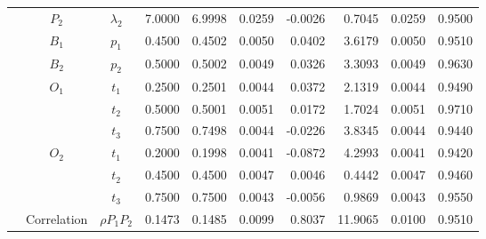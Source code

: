 \documentclass[letterpaper]{article}
\begin{document}
\begin{table}[h]
\begin{tabular}{cccrrrrrrr}
            & $P_2$       & $\lambda_2$    & 7.0000                 & 6.9998                 & 0.0259                 & -0.0026                & 0.7045                 & 0.0259                   & 0.9500                 \\
            & $B_1$       & $p_1$          & 0.4500                 & 0.4502                 & 0.0050                 & 0.0402                 & 3.6179                 & 0.0050                   & 0.9510                 \\
            & $B_2$       & $p_2$          & 0.5000                 & 0.5002                 & 0.0049                 & 0.0326                 & 3.3093                 & 0.0049                   & 0.9630                 \\
            & $O_1$       & $t_1$          & 0.2500                 & 0.2501                 & 0.0044                 & 0.0372                 & 2.1319                 & 0.0044                   & 0.9490                 \\
            &             & $t_2$          & 0.5000                 & 0.5001                 & 0.0051                 & 0.0172                 & 1.7024                 & 0.0051                   & 0.9710                 \\
            &             & $t_3$          & 0.7500                 & 0.7498                 & 0.0044                 & -0.0226                & 3.8345                 & 0.0044                   & 0.9440                 \\
            & $O_2$       & $t_1$          & 0.2000                 & 0.1998                 & 0.0041                 & -0.0872                & 4.2993                 & 0.0041                   & 0.9420                 \\
            &             & $t_2$          & 0.4500                 & 0.4500                 & 0.0047                 & 0.0046                 & 0.4442                 & 0.0047                   & 0.9460                 \\
            &             & $t_3$          & 0.7500                 & 0.7500                 & 0.0043                 & -0.0056                & 0.9869                 & 0.0043                   & 0.9550                 \\
            & Correlation & $\rho{P_1P_2}$ & 0.1473                 & 0.1485                 & 0.0099                 & 0.8037                 & 11.9065                & 0.0100                   & 0.9510                 \\

\end{tabular}
\end{table}
\end{document}

